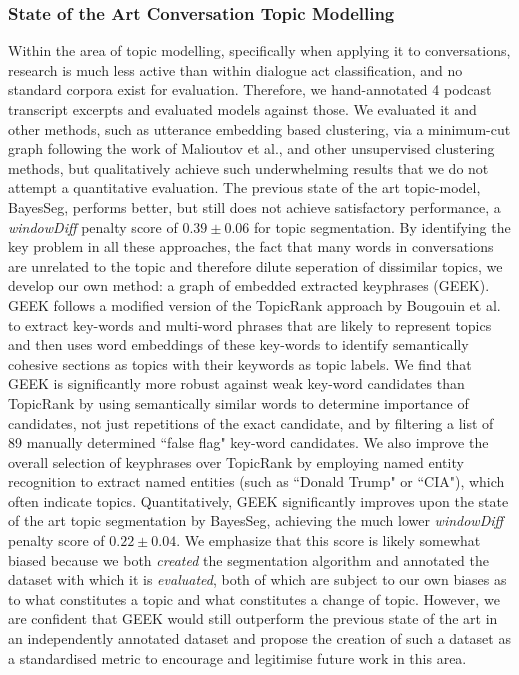 \subsubsection{State of the Art Conversation Topic Modelling}
    Within the area of topic modelling, specifically when applying it to conversations, research is much less active than within dialogue act classification, and no standard corpora exist for evaluation. Therefore, we hand-annotated 4 podcast transcript excerpts and evaluated models against those. We evaluated it and other methods, such as utterance embedding based clustering, via a minimum-cut graph following the work of Malioutov et al., and other unsupervised clustering methods, but qualitatively achieve such underwhelming results that we do not attempt a quantitative evaluation. The previous state of the art topic-model, BayesSeg, performs better, but still does not achieve satisfactory performance, a \textit{windowDiff} penalty score of $0.39 \pm 0.06$ for topic segmentation.
    By identifying the key problem in all these approaches, the fact that many words in conversations are unrelated to the topic and therefore dilute seperation of dissimilar topics, we develop our own method: a graph of embedded extracted keyphrases (GEEK).
    GEEK follows a modified version of the TopicRank approach by Bougouin et al. to extract key-words and multi-word phrases that are likely to represent topics and then uses word embeddings of these key-words to identify semantically cohesive sections as topics with their keywords as topic labels. We find that GEEK is significantly more robust against weak key-word candidates than TopicRank by using semantically similar words to determine importance of candidates, not just repetitions of the exact candidate, and by filtering a list of 89 manually determined ``false flag" key-word candidates. We also improve the overall selection of keyphrases over TopicRank by employing named entity recognition to extract named entities (such as ``Donald Trump" or ``CIA"), which often indicate topics. Quantitatively, GEEK significantly improves upon the state of the art topic segmentation by BayesSeg, achieving the much lower \textit{windowDiff} penalty score of $\mathbf{0.22 \pm 0.04}$. We emphasize that this score is likely somewhat biased because we both \textit{created} the segmentation algorithm and annotated the dataset with which it is \textit{evaluated}, both of which are subject to our own biases as to what constitutes a topic and what constitutes a change of topic. However, we are confident that GEEK would still outperform the previous state of the art in an independently annotated dataset and propose the creation of such a dataset as a standardised metric to encourage and legitimise future work in this area.

